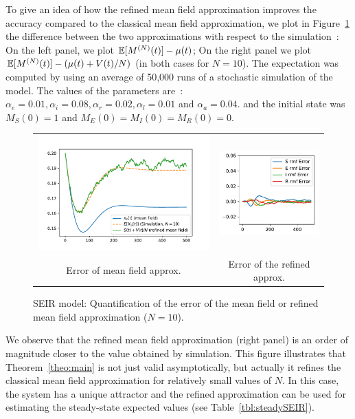 \documentclass{sig-alternate-per}
\newcommand\MN{M^{(N)}}
\newcommand\esp[1]{{\mathchoice{\besp{#1}}{\sesp{#1}}{\sesp{#1}}{\sesp{#1}}}}
\newcommand\besp[1]{\mathbb{E}\left[#1\right]}
\newcommand\sesp[1]{\mathbb{E}[#1]}
\begin{document}
To give an idea of how the refined mean field approximation improves
the accuracy compared to the classical mean field approximation, we
plot in Figure~\ref{fig:diff} the difference between the two
approximations with respect to the simulation~: On the left panel, we
plot $\esp{\MN(t)}-\mu(t)$; On the right panel we plot
$\esp{\MN(t)}-(\mu(t)+V(t)/N)$ (in both cases for $N=10$). The
expectation was computed by using an average of 50,000 runs of a
stochastic simulation of the model.  The values of the parameters
are~: $\alpha_e=0.01, \alpha_i=0.08,\alpha_r=0.02,\alpha_l=0.01$ and
$\alpha_a=0.04$. and the initial state was $M_S(0)=1$ and
$M_E(0)=M_I(0)=M_R(0)=0$.
\begin{figure}[ht]
  \begin{center}
    \begin{tabular}{cc}
      \includegraphics[width=0.45\linewidth]{SEIR_errorMF_N10}
      &\includegraphics[width=0.45\linewidth]{SEIR_errorRMF_N10}\\
      Error of mean field approx.
      &
        Error of the refined approx.
    \end{tabular}\vspace{-.2cm}
  \end{center}
  \caption{\label{fig:diff} SEIR model: Quantification of the error of
    the mean field or refined mean field approximation ($N=10$).}
\end{figure}

We observe that the refined mean field approximation (right panel) is
an order of magnitude closer to the value obtained by simulation. This
figure illustrates that Theorem~\ref{theo:main} is not just valid
asymptotically, but actually it refines the classical mean field
approximation for relatively small values of $N$. In this case, the
system has a unique attractor and the refined approximation can be
used for estimating the steady-state expected values (see
Table~\ref{tbl:steadySEIR}).
\end{document}
